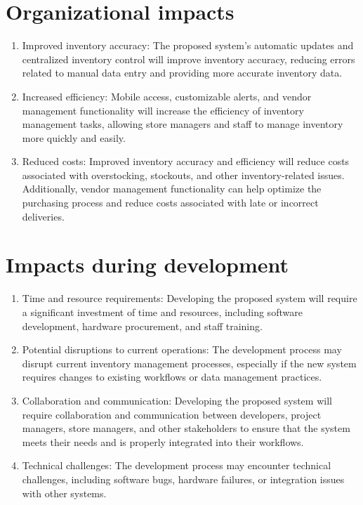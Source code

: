 \section{Organizational impacts \label{Section::Organizationalimpacts}}
\begin{enumerate}
    \item Improved inventory accuracy: The proposed system's automatic updates and centralized inventory control will improve inventory accuracy, reducing errors related to manual data entry and providing more accurate inventory data.

    \item Increased efficiency: Mobile access, customizable alerts, and vendor management functionality will increase the efficiency of inventory management tasks, allowing store managers and staff to manage inventory more quickly and easily.

    \item Reduced costs: Improved inventory accuracy and efficiency will reduce costs associated with overstocking, stockouts, and other inventory-related issues. Additionally, vendor management functionality can help optimize the purchasing process and reduce costs associated with late or incorrect deliveries.
\end{enumerate}

\section{Impacts during development \label{Section::Impactsduringdevelopment}}
\begin{enumerate}
    \item Time and resource requirements: Developing the proposed system will require a significant investment of time and resources, including software development, hardware procurement, and staff training.

    \item Potential disruptions to current operations: The development process may disrupt current inventory management processes, especially if the new system requires changes to existing workflows or data management practices.

    \item Collaboration and communication: Developing the proposed system will require collaboration and communication between developers, project managers, store managers, and other stakeholders to ensure that the system meets their needs and is properly integrated into their workflows.

    \item Technical challenges: The development process may encounter technical challenges, including software bugs, hardware failures, or integration issues with other systems.
\end{enumerate}

